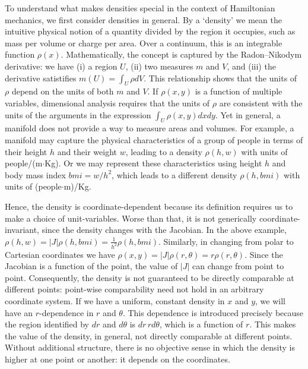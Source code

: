 \documentclass[12pt, english, twoside]{article} %
\begin{document}
To understand what makes densities special in the context of Hamiltonian mechanics, we first consider densities in general. By a `density' we mean the intuitive physical notion of a quantity divided by the region it occupies, such as mass per volume or charge per area. Over a continuum, this is an integrable function $\rho(x)$. Mathematically, the concept is captured by the Radon–Nikodym derivative: we have (i) a region $U$, (ii) two measures $m$ and $V$, and (iii) the derivative satistifies $m(U) = \int_U \rho dV$. This relationship shows that the units of $\rho$ depend on the units of both $m$ and $V$. If $\rho(x, y)$ is a function of multiple variables, dimensional analysis requires that the units of $\rho$ are consistent with the units of the arguments in the expression $\int_U \rho(x, y) dx dy$. Yet in general, a manifold does not provide a way to measure areas and volumes. For example, a manifold may capture the physical characteristics of a group of people in terms of their height $h$ and their weight $w$, leading to a density $\rho(h,w)$ with units of people/(m$\cdot$Kg). Or we may represent these characteristics using height $h$ and body mass index $bmi = w / h^2$, which leads to a different density $\rho(h,bmi)$ with units of (people$\cdot$m)/Kg.

Hence, the density is coordinate-dependent because its definition requires us to make a choice of unit-variables. Worse than that, it is not generically coordinate-invariant, since the density changes with the Jacobian. In the above example, $\rho(h,w) = |J| \rho(h, bmi) = \frac{1}{h^2} \rho(h, bmi)$. Similarly, in changing from polar to Cartesian coordinates we have $\rho(x,y) = |J| \rho(r, \theta) = r \rho(r, \theta)$. Since the Jacobian is a function of the point, the value of $|J|$ can change from point to point. Consequently, the density is not guaranteed to be directly comparable at different points: point-wise comparability need not hold in an arbitrary coordinate system. If we have a uniform, constant density in $x$ and $y$, we will have an $r$-dependence in $r$ and $\theta$. This dependence is introduced precisely because the region identified by $dr$ and $d\theta$ is $dr \,r d\theta$, which is a function of $r$. This makes the value of the density, in general, not directly comparable at different points. Without additional structure, there is no objective sense in which the density is higher at one point or another: it depends on the coordinates.

\end{document}
